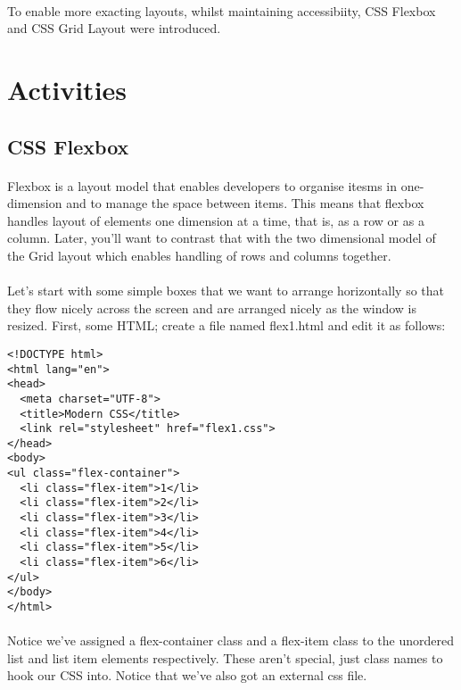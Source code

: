 \documentclass[10pt, a4paper, twosize]{article}
\begin{document}
\paragraph{} To enable more exacting layouts, whilst maintaining accessibiity, CSS Flexbox and CSS Grid Layout were introduced. 

\section*{Activities}

\subsection*{CSS Flexbox}
\paragraph{} Flexbox is a layout model that enables developers to organise itesms in one-dimension and to manage the space between items. This means that flexbox handles layout of elements one dimension at a time, that is, as a row or as a column. Later, you'll want to contrast that with the two dimensional model of the Grid layout which enables handling of rows and columns together.

\paragraph{} Let's start with some simple boxes that we want to arrange horizontally so that they flow nicely across the screen and are arranged nicely as the window is resized. First, some HTML; create a file named flex1.html and edit it as follows:

\begin{lstlisting}
<!DOCTYPE html>
<html lang="en">
<head>
  <meta charset="UTF-8">
  <title>Modern CSS</title>
  <link rel="stylesheet" href="flex1.css">
</head>
<body>
<ul class="flex-container">
  <li class="flex-item">1</li>
  <li class="flex-item">2</li>
  <li class="flex-item">3</li>
  <li class="flex-item">4</li>
  <li class="flex-item">5</li>
  <li class="flex-item">6</li>
</ul>
</body>
</html>
\end{lstlisting}
\paragraph{} Notice we've assigned a flex-container class and a flex-item class to the unordered list and list item elements respectively. These aren't special, just class names to hook our CSS into. Notice that we've also got an external css file.
\end{document}
